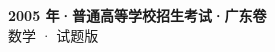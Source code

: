 \documentclass[zihao=-4, a4paper]{ctexart}
\begin{document}
\begin{center}
  {\Large\bfseries 2005 年·普通高等学校招生考试·广东卷}\\[4pt]
  {\large 数学 · 试题版}
\end{center}
\medskip
{}

\end{document}
